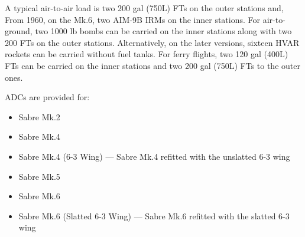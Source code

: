 A typical air-to-air load is two 200 gal (750L) FTs on the outer stations and, From 1960, on the Mk.6, two AIM-9B IRMs on the inner stations. For air-to-ground, two 1000 lb bombs can be carried on the inner stations along with two 200 FTs on the outer stations. Alternatively, on the later versions, sixteen HVAR rockets can be carried without fuel tanks. For ferry flights, two 120 gal (400L) FTs can be carried on the inner stations and two 200 gal (750L) FTs to the outer ones.

ADCs are provided for:
\begin{itemize}
\item Sabre Mk.2
\item Sabre Mk.4
\item Sabre Mk.4 (6-3 Wing) --- Sabre Mk.4 refitted with the unslatted 6-3 wing
\item Sabre Mk.5
\item Sabre Mk.6
\item Sabre Mk.6 (Slatted 6-3 Wing) --- Sabre Mk.6 refitted with the slatted 6-3 wing
\end{itemize}
